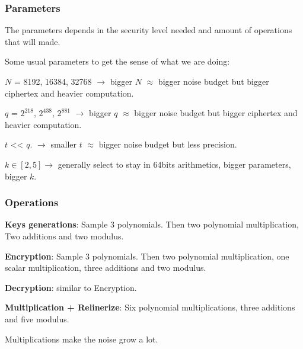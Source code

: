 \documentclass[10pt,handout]{beamer}
\begin{document}
\begin{frame}
\frametitle{Parameters}

The parameters depends in the security level needed and amount of operations that will made.


Some usual parameters to get the sense of what we are doing:

$N$ = 8192, 16384, 32768 $\rightarrow$ bigger $N$ $\approx$ bigger noise budget but bigger ciphertex and heavier computation.

    $q$ = $2^{218}$,   $2^{438}$,  $2^{881}$ $\rightarrow$ bigger $q$ $\approx$ bigger noise budget but bigger ciphertex and heavier computation.

    $t$  << $q$. $\rightarrow$ smaller $t$ $\approx$ bigger noise budget but less precision.

    $k\in [2,5] \rightarrow$ generally select to stay in 64bits arithmetics, bigger parameters, bigger $k$.


\end{frame}

\begin{frame}
\frametitle{Operations}

    \textbf{Keys generations}: Sample 3 polynomials. Then two polynomial multiplication, Two additions and two modulus.

    \textbf{Encryption}: Sample 3 polynomials. Then two polynomial multiplication, one scalar multiplication, three additions and two modulus.

    \textbf{Decryption}: similar to Encryption.

    \textbf{Multiplication + Relinerize}: Six polynomial multiplications, three additions and five modulus.

   Multiplications make the noise grow a lot.


\end{frame}


\end{document}
